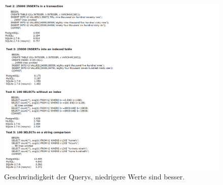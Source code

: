 \begin{figure}[h]
    \begin{center}
        \includegraphics[scale=0.4]{./pics/speed.png}
        \caption{Geschwindigkeit der Querys, niedrigere Werte sind besser.}
        \label{geschwindigkeit_der_querys}
    \end{center}
\end{figure}
\newpage